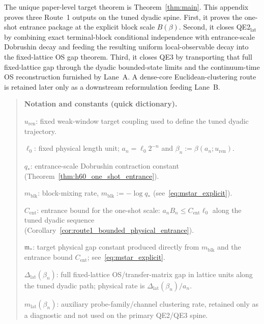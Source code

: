 
\providecommand{\Nb}{N_b}
\providecommand{\Ccount}{C_{\mathrm{count}}}
\providecommand{\Cint}{C_{\mathrm{int}}}
\providecommand{\Cact}{C_{\mathrm{act}}}
\providecommand{\Kzero}{K_0}
\providecommand{\Ktwo}{K_2}
\providecommand{\Krep}{K_{\mathrm{rep}}}
\providecommand{\Kproj}{K_{\mathrm{proj}}}
\providecommand{\Kact}{\overline{K}_{\mathrm{act}}}
\providecommand{\gb}{g_b}
\providecommand{\qkp}{q}
\providecommand{\dist}{\mathrm{dist}}
\providecommand{\E}{\mathbb{E}}

\begin{remark}
The unique paper-level target theorem is Theorem~\ref{thm:main}.
This appendix proves three Route~1 outputs on the tuned dyadic spine.
First, it proves the one-shot entrance package at the explicit block scale $B(\beta)$.
Second, it closes QE2$_{\mathrm{lat}}$ by combining exact terminal-block conditional independence with entrance-scale Dobrushin decay and feeding the resulting uniform local-observable decay into the fixed-lattice OS gap theorem.
Third, it closes QE3 by transporting that full fixed-lattice gap through the dyadic bounded-state limits and the continuum-time OS reconstruction furnished by Lane~A.
A dense-core Euclidean-clustering route is retained later only as a downstream reformulation feeding Lane~B.
\end{remark}


\begin{quote}\small
\noindent\textbf{Notation and constants (quick dictionary).}\par\smallskip
\noindent$u_{\mathrm{ren}}$: fixed weak-window target coupling used to define the tuned dyadic trajectory.\par
\noindent$\ell_0$: fixed physical length unit; $a_n=\ell_0 2^{-n}$ and $\beta_n:=\beta(a_n;u_{\mathrm{ren}})$.\par
\noindent$q_\ast$: entrance-scale Dobrushin contraction constant (Theorem~\ref{thm:h60_one_shot_entrance}).\par
\noindent$m_{\mathrm{blk}}$: block-mixing rate, $m_{\mathrm{blk}}:=-\log q_\ast$ (see~\eqref{eq:mstar_explicit}).\par
\noindent$C_{\mathrm{ent}}$: entrance bound for the one-shot scale: $a_nB_n\le C_{\mathrm{ent}}\ell_0$ along the tuned dyadic sequence (Corollary~\ref{cor:route1_bounded_physical_entrance}).\par
\noindent$\mathfrak m_\ast$: target physical gap constant produced directly from $m_{\mathrm{blk}}$ and the entrance bound $C_{\mathrm{ent}}$; see~\eqref{eq:mstar_explicit}.\par
\noindent$\Delta_{\mathrm{lat}}(\beta_n)$: full fixed-lattice OS/transfer-matrix gap in lattice units along the tuned dyadic path; physical rate is $\Delta_{\mathrm{lat}}(\beta_n)/a_n$.\par
\noindent$m_{\mathrm{lat}}(\beta_n)$: auxiliary probe-family/channel clustering rate, retained only as a diagnostic and not used on the primary QE2/QE3 spine.
\end{quote}

